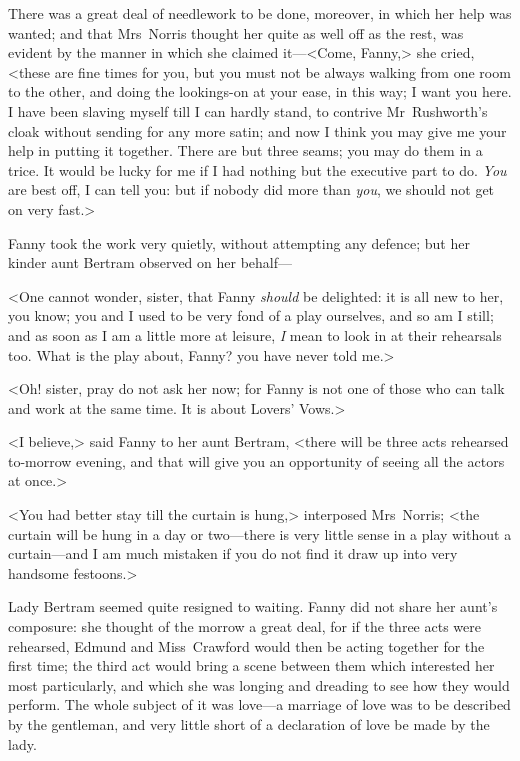 There was a great deal of needlework to be done, moreover, in which her help was wanted; and that Mrs~Norris thought her quite as well off as the rest, was evident by the manner in which she claimed it—<Come, Fanny,> she cried, <these are fine times for you, but you must not be always walking from one room to the other, and doing the lookings-on at your ease, in this way; I want you here. I have been slaving myself till I can hardly stand, to contrive Mr~Rushworth's cloak without sending for any more satin; and now I think you may give me your help in putting it together. There are but three seams; you may do them in a trice. It would be lucky for me if I had nothing but the executive part to do. \textit{You}  are best off, I can tell you: but if nobody did more than \textit{you}, we should not get on very fast.>

Fanny took the work very quietly, without attempting any defence; but her kinder aunt Bertram observed on her behalf—

<One cannot wonder, sister, that Fanny \textit{should}  be delighted: it is all new to her, you know; you and I used to be very fond of a play ourselves, and so am I still; and as soon as I am a little more at leisure, \textit{I}  mean to look in at their rehearsals too. What is the play about, Fanny? you have never told me.>

<Oh! sister, pray do not ask her now; for Fanny is not one of those who can talk and work at the same time. It is about Lovers' Vows.>

<I believe,> said Fanny to her aunt Bertram, <there will be three acts rehearsed to-morrow evening, and that will give you an opportunity of seeing all the actors at once.>

<You had better stay till the curtain is hung,> interposed Mrs~Norris; <the curtain will be hung in a day or two—there is very little sense in a play without a curtain—and I am much mistaken if you do not find it draw up into very handsome festoons.>

Lady Bertram seemed quite resigned to waiting. Fanny did not share her aunt's composure: she thought of the morrow a great deal, for if the three acts were rehearsed, Edmund and Miss~Crawford would then be acting together for the first time; the third act would bring a scene between them which interested her most particularly, and which she was longing and dreading to see how they would perform. The whole subject of it was love—a marriage of love was to be described by the gentleman, and very little short of a declaration of love be made by the lady.

